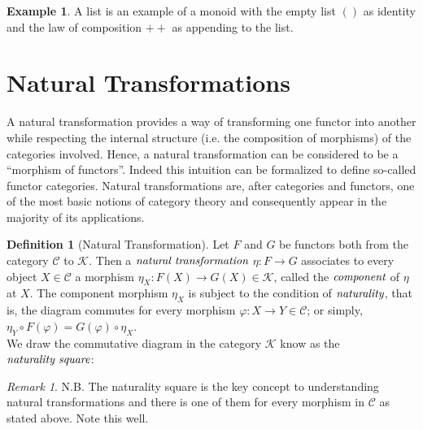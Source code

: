 \documentclass[10pt, oneside, reqno]{amsart}
\theoremstyle{plain}%
\theoremstyle{definition}
\newtheorem{defn}[thm]{Definition}
\newtheorem{exmp}[thm]{Example}
\theoremstyle{remark}
\newtheorem*{rem}{Remark}
\newcommand{\Id}{\mathit{id}_}
\begin{document}
\begin{exmp}
 A list is an example of a monoid with the empty list $()$ as identity and the law of composition $++$ as appending to the list.
\end{exmp}




\section{Natural Transformations} %
\label{sec:natural transformations}
A natural transformation provides a way of transforming one functor into another
while respecting the internal structure (i.e. the composition of morphisms) of the categories involved.
Hence, a natural transformation can be considered to be a ``morphism of functors''.
Indeed this intuition can be formalized to define so-called functor categories.
Natural transformations are, after categories and functors, one of the most basic notions of category theory
and consequently appear in the majority of its applications.

\begin{defn}[Natural Transformation]
 Let $F$ and $G$ be functors both from the category $\mathcal{C}$ to $\mathcal{K}$.
 Then a $\emph{natural transformation}$ $\eta : F \to G$ associates to every object
 $X \in \mathcal{C}$ a morphism $\eta_{X} : F(X) \to G(X) \in \mathcal{K}$, called the $\emph{component}$
 of $\eta$ at $X$. The component morphism $\eta_{X}$ is subject to the condition of $\emph{naturality}$,
 that is, the diagram commutes for every morphism $\varphi: X \to Y \in \mathcal{C}$; or simply,
 $\eta_{Y} \circ F(\varphi) = G(\varphi) \circ \eta_{X}$.
 \\
 We draw the commutative diagram in the category $\mathcal{K}$ know as the $\emph{naturality square}$:
\end{defn}
\begin{rem}
 N.B. The naturality square is the key concept to understanding natural transformations and
 there is one of them for every morphism in $\mathcal{C}$ as stated above. Note this well.
\end{rem}
\end{document}
